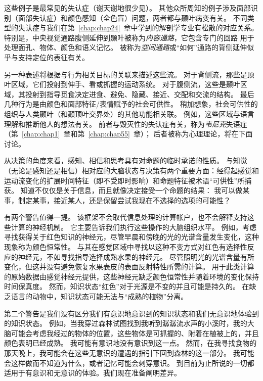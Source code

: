 这些例子是最常见的失认症（谢天谢地很少见）。
其他众所周知的例子涉及面部识别（面部失认症）和颜色感知（全色盲）问题，两者都与颞叶病变有关。
不同类型的失认症与我们在第~\ref{chap:chap24}~章中学到的解剖学专业有松散的对应关系。
特别是，中央视觉通路腹侧延伸到颞叶被称为\textit{内容通路}，它包含专门的回路 用于处理面孔、物体、颜色和语义记忆。
被称为\textit{空间通路}或“如何”通路的背侧延伸似乎与支持定位的表征有关。


另一种表述将根据与行为相关目标的关联来描述这些流。
对于背侧流，那些是顶叶区域，它们投射到伸手、看或抓握的运动系统。
对于腹侧流，这些是颞叶区域，其投射到指导觅食决定进食、避免、隐藏、接近、交配和交流的结构。
最后几种行为是由颜色和面部特征/表情赋予的社会可供性。
稍加想象，社会可供性的组织与人类颞叶（和颞顶叶交界处）的其他功能相关联。
例如，这些区域与语言理解和推断他人的想法有关。
前者与毁灭性的失认症有关，称为\textit{韦尼克}失语症（第~\ref{chap:chap1}~章和第~\ref{chap:chap55}~章）；
后者被称为心理理论，将在下面讨论。


从决策的角度来看，感知、相信和思考具有对命题的临时承诺的性质。
与知觉（无论是感知还是相信）相对应的大脑状态与决策有两个重要方面：经得起感觉和运动流变化的扩展时间特征（即不受即时影响）和命题特征被术语“可供性”所捕获。
知道不仅仅是关于信息，而且就像决定接受一个命题的结果：
我可以做某事，制定某事，接近某人，还是保留尝试我现在不选择的选项的可能性？


有两个警告值得一提。
该框架不会取代信息处理的计算帐户，也不会解释支持这些计算的神经机制。
它主要告诉我们执行这些操作的大脑组织水平。
例如，考虑寻找获得关于红色知识的神经元，尽管早晨和傍晚的光的光谱含量发生变化，这种现象称为颜色恒常性。
与其在感觉区域中寻找以这种不变方式对红色有选择性反应的神经元，不如寻找指导选择成熟水果的神经元。
尽管照明光的光谱含量有所变化，但这并没有避免恢复水果表皮的表面反射特性所需的计算。
用于此类计算的原始数据由感觉神经元提供，这些神经元缺乏颜色恒常性并随着环境的变化保持时间保真度。
然而，知识状态“红色”对于光源是不变的并且可能是持久的。
在缺乏语言的动物中，知识状态可能无法与“成熟的植物”分离。


第二个警告是我们没有区分我们有意识地意识到的知识状态和我们无意识地体验到的知识状态。
例如，当我穿过森林试图找到我听到潺潺流水声的小溪时，我的大脑可能会考虑我经过的物体的位置，这些物体是可抓握的、附着在植被上的，并且颜色表明已经成熟。
我可能有意识地没有意识到这一点。
然而，在我寻找食物的那天晚上，我可能会在这些无意识的遭遇的指引下回到森林的这一部分。
我可能会这样做而不知道为什么，或者记忆可能会刺穿意识。
到目前为止所说的一切都适用于有意识和无意识的体验。我们现在准备阐明差异。



